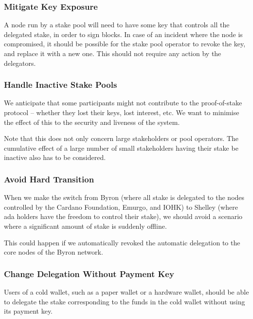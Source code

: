 \documentclass[11pt,a4paper,dvipsnames,twosided]{article}
\begin{document}
\subsubsection{Mitigate Key Exposure}
\label{mitigate-key-exposure}

A node run by a stake pool will need to have some key that controls all
the delegated stake, in order to sign blocks. In case of an incident
where the node is compromised, it should be possible for the stake pool
operator to revoke the key, and replace it with a new one. This should
not require any action by the delegators.

\subsubsection{Handle Inactive Stake Pools}
\label{handle-inactive-stake-pools}

We anticipate that some participants might not contribute to the proof-of-stake
protocol -- whether they lost their keys, lost interest, etc. We want to
minimise the effect of this to the security and liveness of the system.

Note that this does not only concern large stakeholders or pool operators. The
cumulative effect of a large number of small stakeholders having their stake be
inactive also has to be considered.


\subsubsection{Avoid Hard Transition}
\label{avoid-hard-transition}

When we make the switch from Byron (where all stake is delegated to the
nodes controlled by the Cardano Foundation, Emurgo, and IOHK) to Shelley
(where ada holders have the freedom to control their stake), we should
avoid a scenario where a significant amount of stake is suddenly
offline.

This could happen if we automatically revoked the automatic delegation
to the core nodes of the Byron network.

\subsubsection{Change Delegation Without Payment Key}
\label{change-delegation-without-spending-key}

Users of a cold wallet, such as a paper wallet or a hardware wallet,
should be able to delegate the stake corresponding to the funds in the
cold wallet without using its payment key.
\end{document}
